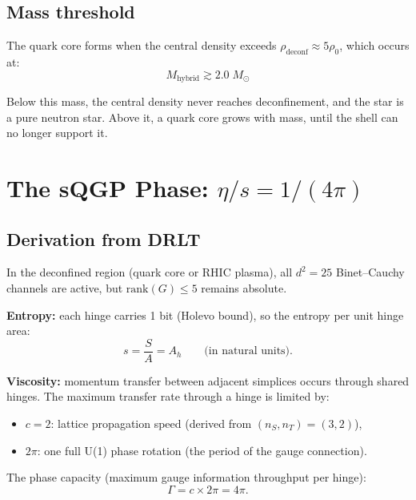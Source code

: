 \documentclass[12pt]{article}
\theoremstyle{definition}
\theoremstyle{remark}
\begin{document}
\subsection{Mass threshold}

The quark core forms when the central density exceeds $\rho_\text{deconf} \approx 5\rho_0$, which occurs at:
\begin{equation}
M_\text{hybrid} \gtrsim 2.0\;M_\odot
\end{equation}

Below this mass, the central density never reaches deconfinement, and the star is a pure neutron star. Above it, a quark core grows with mass, until the shell can no longer support it.

\section{The sQGP Phase: $\eta/s = 1/(4\pi)$}

\subsection{Derivation from DRLT}

In the deconfined region (quark core or RHIC plasma), all $d^2 = 25$ Binet--Cauchy channels are active, but $\text{rank}(G) \leq 5$ remains absolute.

\textbf{Entropy:} each hinge carries 1 bit (Holevo bound), so the entropy per unit hinge area:
\begin{equation}
s = \frac{S}{A} = A_h \qquad \text{(in natural units)}.
\end{equation}

\textbf{Viscosity:} momentum transfer between adjacent simplices occurs through shared hinges. The maximum transfer rate through a hinge is limited by:
\begin{itemize}
\item $c = 2$: lattice propagation speed (derived from $(n_S, n_T) = (3, 2)$),
\item $2\pi$: one full U(1) phase rotation (the period of the gauge connection).
\end{itemize}

The phase capacity (maximum gauge information throughput per hinge):
\begin{equation}
\Gamma = c \times 2\pi = 4\pi.
\end{equation}
\end{document}
